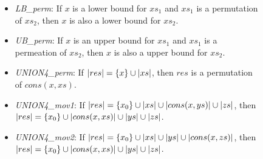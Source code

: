 \documentclass{llncs}
\begin{document}
\begin{figure}[thp]
\begin{itemize}


\item{\it LB\_perm}: If $x$ is a lower bound for $xs_1$ and
$xs_1$ is a permutation of $xs_2$, then $x$ is also a lower bound for $xs_2$.
\item{\it UB\_perm}: If $x$ is an upper bound for $xs_1$ and
$xs_1$ is a permeation of $xs_2$, then $x$ is also a upper bound for $xs_2$.

\item{\it UNION4\_perm}:
If $|res| = \{x\}\cup|xs|$, then $res$ is a permutation of $cons(x, xs)$.

\item{\it UNION4\_mov1}:
If $|res| = \{x_0\}\cup|xs|\cup|cons(x,ys)|\cup|zs|$,
then $|res| = \{x_0\}\cup|cons(x,xs)|\cup|ys|\cup|zs|$.
\item{\it UNION4\_mov2}:
If $|res| = \{x_0\}\cup|xs|\cup|ys|\cup|cons(x,zs)|$,
then $|res| = \{x_0\}\cup|cons(x,xs)|\cup|ys|\cup|zs|$.


\end{itemize}
\end{figure}
\end{document}
